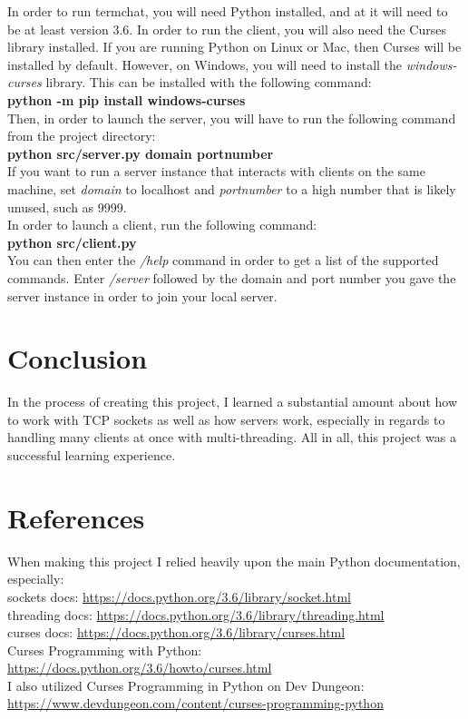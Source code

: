 \documentclass{article}
\begin{document}
    In order to run termchat, you will need Python installed, and at it will
    need to be at least version 3.6. In order to run the client, you will also
    need the Curses library installed. If you are running Python on Linux or
    Mac, then Curses will be installed by default. However, on Windows, you will
    need to install the \emph{windows-curses} library. This can be installed
    with the following command:\\
    \textbf{python -m pip install windows-curses}\\
    Then, in order to launch the server, you will have to run the following
    command from the project directory:\\
    \textbf{python src/server.py domain portnumber}\\
    If you want to run a server instance that interacts with clients on the same
    machine, set \emph{domain} to localhost and \emph{portnumber} to a high
    number that is likely unused, such as 9999.\\
    In order to launch a client, run the following command:\\
    \textbf{python src/client.py}\\
    You can then enter the \emph{/help} command in order to get a list of the
    supported commands. Enter \emph{/server} followed by the domain and port
    number you gave the server instance in order to join your local server.

    \section{Conclusion}
    In the process of creating this project, I learned a substantial amount
    about how to work with TCP sockets as well as how servers work, especially
    in regards to handling many clients at once with multi-threading. All in
    all, this project was a successful learning experience.

    \section{References}
    When making this project I relied heavily upon the main Python
    documentation, especially:\\
    sockets docs: \url{https://docs.python.org/3.6/library/socket.html}\\
    threading docs: \url{https://docs.python.org/3.6/library/threading.html}\\
    curses docs: \url{https://docs.python.org/3.6/library/curses.html}\\
    Curses Programming with Python:
    \url{https://docs.python.org/3.6/howto/curses.html}\\
    I also utilized Curses Programming in Python on Dev Dungeon:
    \url{https://www.devdungeon.com/content/curses-programming-python}\\
\end{document}
